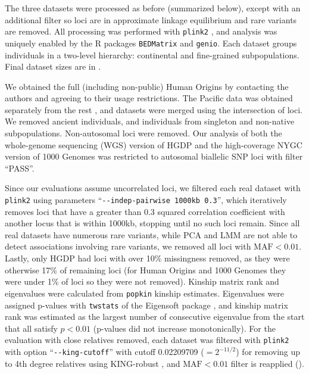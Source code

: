 \documentclass[9pt,lineno]{elife}
\begin{document}
The three datasets were processed as before \citep{ochoa_new_2019} (summarized below), except with an additional filter so loci are in approximate linkage equilibrium and rare variants are removed.
All processing was performed with \texttt{plink2} \citep{chang_second-generation_2015}, and analysis was uniquely enabled by the R packages \texttt{BEDMatrix} \citep{grueneberg_bgdata_2019} and \texttt{genio}.
Each dataset groups individuals in a two-level hierarchy: continental and fine-grained subpopulations.
Final dataset sizes are in .

We obtained the full (including non-public) Human Origins by contacting the authors and agreeing to their usage restrictions.
The Pacific data \citep{skoglund_genomic_2016} was obtained separately from the rest \citep{lazaridis_ancient_2014,lazaridis_genomic_2016}, and datasets were merged using the intersection of loci.
We removed ancient individuals, and individuals from singleton and non-native subpopulations.
Non-autosomal loci were removed.
Our analysis of both the whole-genome sequencing (WGS) version of HGDP \citep{bergstrom_insights_2020} and the high-coverage NYGC version of 1000 Genomes \citep{fairley_international_2020} was restricted to autosomal biallelic SNP loci with filter ``PASS''.

Since our evaluations assume uncorrelated loci, we filtered each real dataset with \texttt{plink2} using parameters ``\texttt{-{}-indep-pairwise 1000kb 0.3}'', which iteratively removes loci that have a greater than 0.3 squared correlation coefficient with another locus that is within 1000kb, stopping until no such loci remain.
Since all real datasets have numerous rare variants, while PCA and LMM are not able to detect associations involving rare variants, we removed all loci with $\text{MAF} < 0.01$.
Lastly, only HGDP had loci with over 10\% missingness removed, as they were otherwise 17\% of remaining loci (for Human Origins and 1000 Genomes they were under 1\% of loci so they were not removed).
Kinship matrix rank and eigenvalues were calculated from \texttt{popkin} kinship estimates.
Eigenvalues were assigned p-values with \texttt{twstats} of the Eigensoft package \citep{patterson_population_2006}, and kinship matrix rank was estimated as the largest number of consecutive eigenvalue from the start that all satisfy $p < 0.01$ (p-values did not increase monotonically).
For the evaluation with close relatives removed, each dataset was filtered with \texttt{plink2} with option ``\texttt{-{}-king-cutoff}'' with cutoff 0.02209709 ($= 2^{-11/2}$) for removing up to 4th degree relatives using KING-robust \citep{manichaikul_robust_2010}, and $\text{MAF} < 0.01$ filter is reapplied ().
\end{document}
